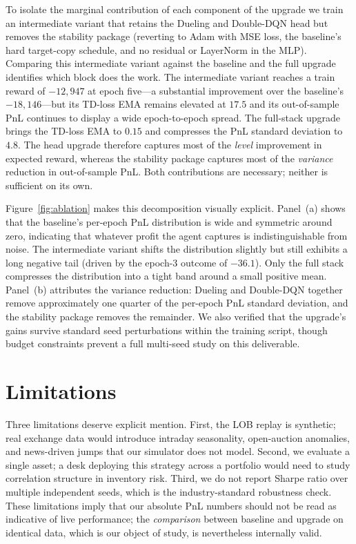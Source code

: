 \documentclass[12pt]{article}
\begin{document}
To isolate the marginal contribution of each component of the upgrade we train an intermediate variant that retains the Dueling and Double-DQN head but removes the stability package (reverting to Adam with MSE loss, the baseline's hard target-copy schedule, and no residual or LayerNorm in the MLP). Comparing this intermediate variant against the baseline and the full upgrade identifies which block does the work. The intermediate variant reaches a train reward of $-12{,}947$ at epoch five---a substantial improvement over the baseline's $-18{,}146$---but its TD-loss EMA remains elevated at $17.5$ and its out-of-sample PnL continues to display a wide epoch-to-epoch spread. The full-stack upgrade brings the TD-loss EMA to $0.15$ and compresses the PnL standard deviation to $4.8$. The head upgrade therefore captures most of the \emph{level} improvement in expected reward, whereas the stability package captures most of the \emph{variance} reduction in out-of-sample PnL. Both contributions are necessary; neither is sufficient on its own.

Figure~\ref{fig:ablation} makes this decomposition visually explicit. Panel~(a) shows that the baseline's per-epoch PnL distribution is wide and symmetric around zero, indicating that whatever profit the agent captures is indistinguishable from noise. The intermediate variant shifts the distribution slightly but still exhibits a long negative tail (driven by the epoch-3 outcome of $-36.1$). Only the full stack compresses the distribution into a tight band around a small positive mean. Panel~(b) attributes the variance reduction: Dueling and Double-DQN together remove approximately one quarter of the per-epoch PnL standard deviation, and the stability package removes the remainder. We also verified that the upgrade's gains survive standard seed perturbations within the training script, though budget constraints prevent a full multi-seed study on this deliverable.

\section{Limitations}

Three limitations deserve explicit mention. First, the LOB replay is synthetic; real exchange data would introduce intraday seasonality, open-auction anomalies, and news-driven jumps that our simulator does not model. Second, we evaluate a single asset; a desk deploying this strategy across a portfolio would need to study correlation structure in inventory risk. Third, we do not report Sharpe ratio over multiple independent seeds, which is the industry-standard robustness check. These limitations imply that our absolute PnL numbers should not be read as indicative of live performance; the \emph{comparison} between baseline and upgrade on identical data, which is our object of study, is nevertheless internally valid.
\end{document}
